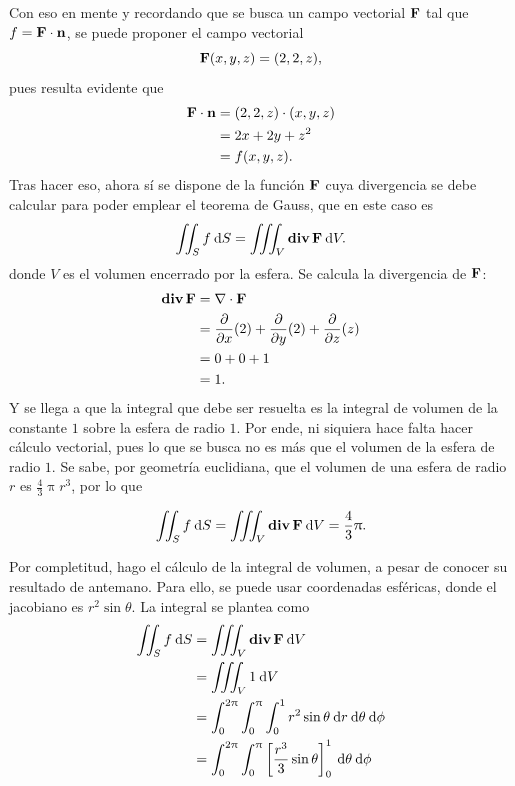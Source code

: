 \documentclass{fmbvecto}
\begin{document}
\begin{problema}
    Con eso en mente y recordando que se busca un campo vectorial \(\boldsymbol{{\mathbf{F}}}\) tal que \(f = \boldsymbol{{\mathbf{F}}} \cdot \boldsymbol{{\mathbf{n}}}\), se puede proponer el campo vectorial
    \[
    \boldsymbol{{\mathbf{F}}}(x, y, z) = (2, 2, z),
    \]
    pues resulta evidente que
    \begin{align*}
        \boldsymbol{{\mathbf{F}}} \cdot \boldsymbol{{\mathbf{n}}} &= (2, 2, z) \cdot (x, y, z) \\
        &= 2x + 2y + z^2 \\
        &= f(x, y, z).
    \end{align*}
    Tras hacer eso, ahora sí se dispone de la función \(\boldsymbol{{\mathbf{F}}}\) cuya divergencia se debe calcular para poder emplear el teorema de Gauss, que en este caso es
    \[
    \iint_S f \: \mathrm{d}S = \iiint_V \operatorname{\mathbf{div}} \boldsymbol{{\mathbf{F}}} \: \mathrm{d}V.
    \]
    donde \(V\) es el volumen encerrado por la esfera. Se calcula la divergencia de \(\boldsymbol{{\mathbf{F}}}\):
    \begin{align*}
        \operatorname{\mathbf{div}} \boldsymbol{{\mathbf{F}}} &= \nabla \cdot \boldsymbol{{\mathbf{F}}} \\
        &= \frac{\partial}{\partial x} (2) + \frac{\partial}{\partial y} (2) + \frac{\partial}{\partial z} (z) \\
        &= 0 + 0 + 1 \\
        &= 1.
    \end{align*}
    Y se llega a que la integral que debe ser resuelta es la integral de volumen de la constante \(1\) sobre la esfera de radio \(1\). Por ende, ni siquiera hace falta hacer cálculo vectorial, pues lo que se busca no es más que el volumen de la esfera de radio \(1\). Se sabe, por geometría euclidiana, que el volumen de una esfera de radio \(r\) es \(\frac{4}{3}\uppi r^3\), por lo que
    \begin{gbox}
        \[
        \iint_S f \: \mathrm{d}S = \iiint_V \operatorname{\mathbf{div}} \boldsymbol{{\mathbf{F}}} \: \mathrm{d}V = \frac{4}{3}\uppi.
        \]
    \end{gbox}
    Por completitud, hago el cálculo de la integral de volumen, a pesar de conocer su resultado de antemano. Para ello, se puede usar coordenadas esféricas, donde el jacobiano es \(r^2 \sin \theta\). La integral se plantea como
    \begin{align*}
        \iint_S f \: \mathrm{d}S &= \iiint_V \div \bvec{F} \: \mathrm{d}V \\
        &= \iiint_V 1 \: \mathrm{d}V \\
        &= \int_0^{2\uppi} \int_0^{\uppi} \int_0^1 r^2 \sin \theta \: \mathrm{d}r \: \mathrm{d}\theta \: \mathrm{d}\phi \\
        &= \int_0^{2\uppi} \int_0^{\uppi} \left[ \frac{r^3}{3} \sin \theta \right]_0^1 \: \mathrm{d}\theta \: \mathrm{d}\phi \\

\end{align*}
\end{problema}
\end{document}
